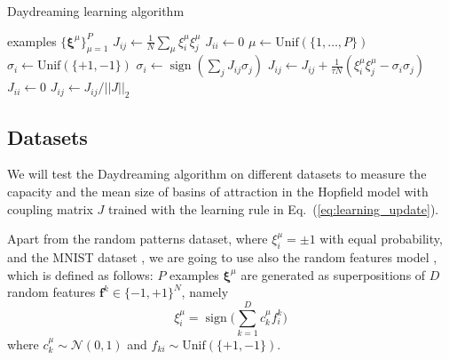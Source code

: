 \documentclass[a4paper]{cas-sc}
\DeclareMathOperator{\sign}{sign}
\newcommand{\bxi}{\boldsymbol{\xi}}
\begin{document}
\begin{algorithm}[t]
\caption{Daydreaming learning algorithm}
\begin{algorithmic}
\Require examples $\{\bxi^{\mu} \}_{\mu=1}^P$
    \State $J_{ij} \gets \frac{1}{N} \sum_{\mu} \xi_i^{\mu} \xi_j^{\mu}$ 
    \State $J_{ii} \gets 0$
     
         
            \State $\mu \gets \mathrm{Unif}(\{1,\dots,P\})$ 
            \State $\sigma_i \gets \mathrm{Unif}(\{+1,-1\}) $ 
                \State $\sigma_i \gets \sign (\sum_j J_{ij} \sigma_j)$ 
            \EndWhile
            \State $J_{ij} \gets J_{ij} + \frac{1}{\tau N} (\xi_i^{\mu} \xi_j^{\mu}-\sigma_i\sigma_j)$ 
            \State $J_{ii} \gets 0$
        \EndFor
        \State $J_{ij} \gets J_{ij} / ||J||_2 $ 
    \EndFor
\end{algorithmic}
\label{alg:Daydreaming}
\end{algorithm}

\subsection{Datasets}
\label{sec:rf_data}

We will test the Daydreaming algorithm on different datasets to measure the capacity and the mean size of basins of attraction in the Hopfield model with coupling matrix $J$ trained with the learning rule in Eq.~(\ref{eq:learning_update}).

Apart from the random patterns dataset, where $\xi_i^\mu=\pm1$ with equal probability, and the MNIST dataset \cite{lecun1998gradient}, we are going to use also the random features model \cite{goldt2020modeling}, which is defined as follows: $P$ examples $\bxi^{\mu}$ are generated as superpositions of $D$ random features $\mathbf{f}^k \in \{-1, +1\}^N$, namely
\begin{equation}
        \xi_i^\mu = \sign \bigg( \sum_{k=1}^D c_k^\mu f_i^k \bigg)
\end{equation}
where $c_k^\mu \sim \mathcal{N}(0,1)$ and $f_{ki}\sim \mathrm{Unif}(\{+1,-1\})$.
\end{document}
